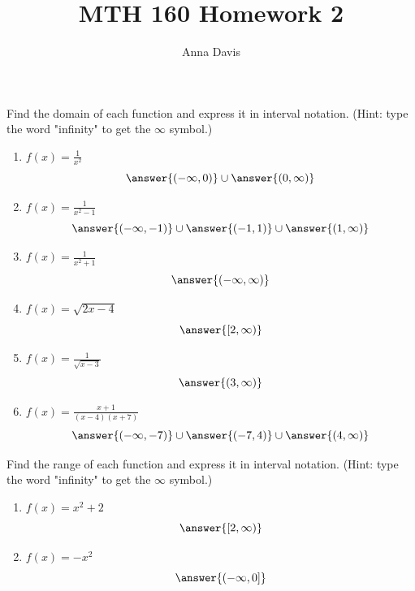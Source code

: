 \documentclass{ximera}
\author{Anna Davis} \title{MTH 160 Homework 2}
\begin{document}
\begin{abstract}

\end{abstract}
\maketitle

\begin{problem}\label{prob:160hom2prob1}
Find the domain of each function and express it in interval notation.  (Hint: type the word "infinity" to get the $\infty$ symbol.)
\begin{enumerate}
    \item $f(x)=\frac{1}{x^2}$
    $$\answer{(-\infty,0)}\cup\answer{(0,\infty)}$$
    \item $f(x)=\frac{1}{x^2-1}$
    $$\answer{(-\infty,-1)}\cup\answer{(-1,1)}\cup\answer{(1,\infty)}$$
    \item $f(x)=\frac{1}{x^2+1}$
    $$\answer{(-\infty,\infty)}$$
    \item $f(x)=\sqrt{2x-4}$
    $$\answer{[2,\infty)}$$
     \item $f(x)=\frac{1}{\sqrt{x-3}}$
    $$\answer{(3,\infty)}$$
    \item $f(x)=\frac{x+1}{(x-4)(x+7)}$
    $$\answer{(-\infty,-7)}\cup\answer{(-7,4)}\cup\answer{(4,\infty)}$$
\end{enumerate}
\end{problem}

\begin{problem}\label{prob:160hom2prob2}
  Find the range of each function and express it in interval notation.  (Hint: type the word "infinity" to get the $\infty$ symbol.)
  \begin{enumerate}
      \item $f(x)=x^2+2$
      $$\answer{[2,\infty)}$$
      \item $f(x)=-x^2$
      $$\answer{(-\infty,0]}$$
  \end{enumerate}
\end{problem}
\end{document}
